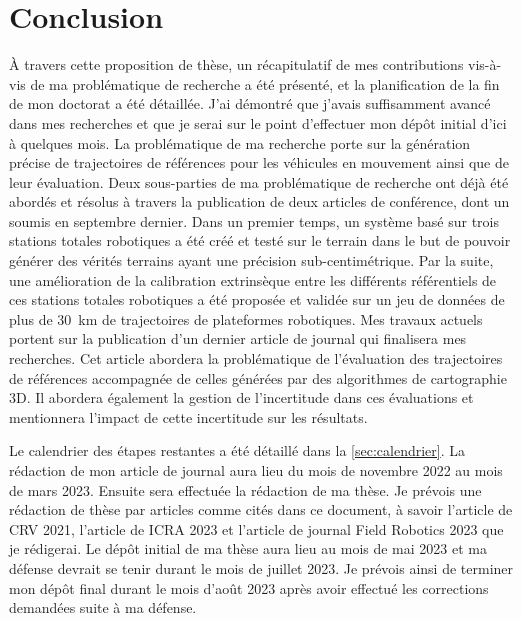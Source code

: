 \section{Conclusion}
\label{sec:conclusion}

À travers cette proposition de thèse, un récapitulatif de mes contributions vis-à-vis de ma problématique de recherche a été présenté, et la planification de la fin de mon doctorat a été détaillée.
J'ai démontré que j'avais suffisamment avancé dans mes recherches et que je serai sur le point d'effectuer mon dépôt initial d'ici à quelques mois.
La problématique de ma recherche porte sur la génération précise de trajectoires de références pour les véhicules en mouvement ainsi que de leur évaluation.
Deux sous-parties de ma problématique de recherche ont déjà été abordés et résolus à travers la publication de deux articles de conférence, dont un soumis en septembre dernier.
Dans un premier temps, un système basé sur trois stations totales robotiques a été créé et testé sur le terrain dans le but de pouvoir générer des vérités terrains ayant une précision sub-centimétrique.
Par la suite, une amélioration de la calibration extrinsèque entre les différents référentiels de ces stations totales robotiques a été proposée et validée sur un jeu de données de plus de \SI{30}{km} de trajectoires de plateformes robotiques.
Mes travaux actuels portent sur la publication d'un dernier article de journal qui finalisera mes recherches.
Cet article abordera la problématique de l'évaluation des trajectoires de références accompagnée de celles générées par des algorithmes de cartographie 3D.
Il abordera également la gestion de l'incertitude dans ces évaluations et mentionnera l'impact de cette incertitude sur les résultats.

Le calendrier des étapes restantes a été détaillé dans la \autoref{sec:calendrier}.
La rédaction de mon article de journal aura lieu du mois de novembre 2022 au mois de mars 2023.
Ensuite sera effectuée la rédaction de ma thèse.
Je prévois une rédaction de thèse par articles comme cités dans ce document, à savoir l'article de CRV 2021, l'article de ICRA 2023 et l'article de journal Field Robotics 2023 que je rédigerai.
Le dépôt initial de ma thèse aura lieu au mois de mai 2023 et ma défense devrait se tenir durant le mois de juillet 2023.
Je prévois ainsi de terminer mon dépôt final durant le mois d'août 2023 après avoir effectué les corrections demandées suite à ma défense.

